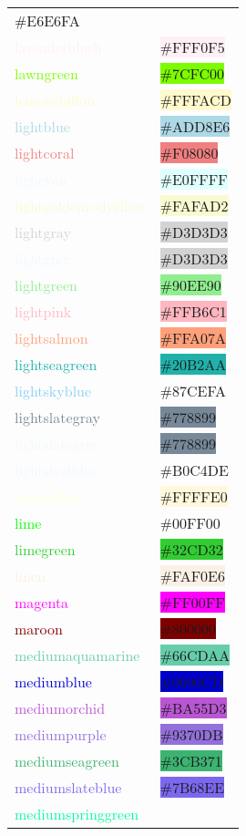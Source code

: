 \documentclass[
]{article}
\begin{document}
\begin{longtable}[]{@{}ll@{}}
\colorbox{lightlavender}{\#E6E6FA}\tabularnewline
\textcolor{lavenderblush}{lavenderblush} &
\colorbox{lavenderblush}{\#FFF0F5}\tabularnewline
\textcolor{lawngreen}{lawngreen} &
\colorbox{lawngreen}{\#7CFC00}\tabularnewline
\textcolor{lemonchiffon}{lemonchiffon} &
\colorbox{lemonchiffon}{\#FFFACD}\tabularnewline
\textcolor{lightblue}{lightblue} &
\colorbox{lightblue}{\#ADD8E6}\tabularnewline
\textcolor{lightcoral}{lightcoral} &
\colorbox{lightcoral}{\#F08080}\tabularnewline
\textcolor{aliceblue}{lighcyan} &
\colorbox{lightcyan}{\#E0FFFF}\tabularnewline
\textcolor{lightgoldenrodyellow}{lightgoldenrodyellow} &
\colorbox{lightgoldenrodyellow}{\#FAFAD2}\tabularnewline
\textcolor{lightgray}{lightgray} &
\colorbox{lightgray}{\#D3D3D3}\tabularnewline
\textcolor{aliceblue}{lightgrey} &
\colorbox{lightgray}{\#D3D3D3}\tabularnewline
\textcolor{lightgreen}{lightgreen} &
\colorbox{lightgreen}{\#90EE90}\tabularnewline
\textcolor{lightpink}{lightpink} &
\colorbox{lightpink}{\#FFB6C1}\tabularnewline
\textcolor{lightsalmon}{lightsalmon} &
\colorbox{lightsalmon}{\#FFA07A}\tabularnewline
\textcolor{lightseagreen}{lightseagreen} &
\colorbox{lightseagreen}{\#20B2AA}\tabularnewline
\textcolor{lightskyblue}{lightskyblue} &
\colorbox{babyblue}{\#87CEFA}\tabularnewline
\textcolor{lightslategray}{lightslategray} &
\colorbox{lightslategray}{\#778899}\tabularnewline
\textcolor{aliceblue}{lightslategrey} &
\colorbox{lightslategray}{\#778899}\tabularnewline
\textcolor{aliceblue}{lightsteelblue} &
\colorbox{pastelblue}{\#B0C4DE}\tabularnewline
\textcolor{lightyellow}{lightyellow} &
\colorbox{cornsilk}{\#FFFFE0}\tabularnewline
\textcolor{lime}{lime} &
\colorbox{electricgreen}{\#00FF00}\tabularnewline
\textcolor{limegreen}{limegreen} &
\colorbox{limegreen}{\#32CD32}\tabularnewline
\textcolor{linen}{linen} & \colorbox{linen}{\#FAF0E6}\tabularnewline
\textcolor{magenta}{magenta} &
\colorbox{fuchsia}{\#FF00FF}\tabularnewline
\textcolor{maroon}{maroon} & \colorbox{maroon}{\#800000}\tabularnewline
\textcolor{mediumaquamarine}{mediumaquamarine} &
\colorbox{mediumaquamarine}{\#66CDAA}\tabularnewline
\textcolor{mediumblue}{mediumblue} &
\colorbox{mediumblue}{\#0000CD}\tabularnewline
\textcolor{mediumorchid}{mediumorchid} &
\colorbox{mediumorchid}{\#BA55D3}\tabularnewline
\textcolor{mediumpurple}{mediumpurple} &
\colorbox{mediumpurple}{\#9370DB}\tabularnewline
\textcolor{mediumseagreen}{mediumseagreen} &
\colorbox{mediumseagreen}{\#3CB371}\tabularnewline
\textcolor{mediumslateblue}{mediumslateblue} &
\colorbox{mediumslateblue}{\#7B68EE}\tabularnewline
\textcolor{mediumspringgreen}{mediumspringgreen} &

\end{longtable}
\end{document}
